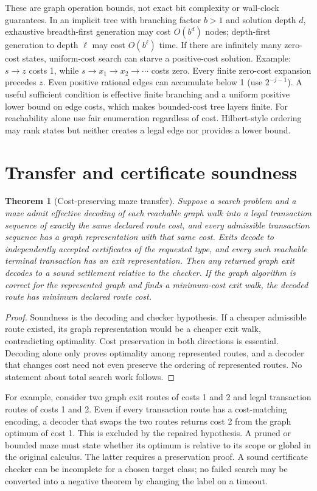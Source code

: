 \documentclass[11pt]{article}
\newtheorem{theorem}{Theorem}[section]\newtheorem{proposition}[theorem]{Proposition}\newtheorem{lemma}[theorem]{Lemma}\newtheorem{corollary}[theorem]{Corollary}
\theoremstyle{definition}\newtheorem{definition}[theorem]{Definition}\newtheorem{example}[theorem]{Example}\newtheorem{conjecture}[theorem]{Conjecture}
\begin{document}
These are graph operation bounds, not exact bit complexity or wall-clock guarantees. In an implicit tree with branching factor $b>1$ and solution depth $d$, exhaustive breadth-first generation may cost $O(b^d)$ nodes; depth-first generation to depth $\ell$ may cost $O(b^\ell)$ time. If there are infinitely many zero-cost states, uniform-cost search can starve a positive-cost solution. Example: $s\to z$ costs 1, while $s\to x_1\to x_2\to\cdots$ costs zero. Every finite zero-cost expansion precedes $z$. Even positive rational edges can accumulate below 1 (use $2^{-j-1}$). A useful sufficient condition is effective finite branching and a uniform positive lower bound on edge costs, which makes bounded-cost tree layers finite. For reachability alone use fair enumeration regardless of cost. Hilbert-style ordering may rank states but neither creates a legal edge nor provides a lower bound.
\section{Transfer and certificate soundness}
\begin{theorem}[Cost-preserving maze transfer]
Suppose a search problem and a maze admit effective decoding of each reachable graph walk into a legal transaction sequence of exactly the same declared route cost, and every admissible transaction sequence has a graph representation with that same cost. Exits decode to independently accepted certificates of the requested type, and every such reachable terminal transaction has an exit representation. Then any returned graph exit decodes to a sound settlement relative to the checker. If the graph algorithm is correct for the represented graph and finds a minimum-cost exit walk, the decoded route has minimum declared route cost.
\end{theorem}
\begin{proof} Soundness is the decoding and checker hypothesis. If a cheaper admissible route existed, its graph representation would be a cheaper exit walk, contradicting optimality. Cost preservation in both directions is essential. Decoding alone only proves optimality among represented routes, and a decoder that changes cost need not even preserve the ordering of represented routes. No statement about total search work follows.\end{proof}
For example, consider two graph exit routes of costs 1 and 2 and legal transaction routes of costs 1 and 2. Even if every transaction route has a cost-matching encoding, a decoder that swaps the two routes returns cost 2 from the graph optimum of cost 1. This is excluded by the repaired hypothesis. A pruned or bounded maze must state whether its optimum is relative to its scope or global in the original calculus. The latter requires a preservation proof. A sound certificate checker can be incomplete for a chosen target class; no failed search may be converted into a negative theorem by changing the label on a timeout.
\end{document}
